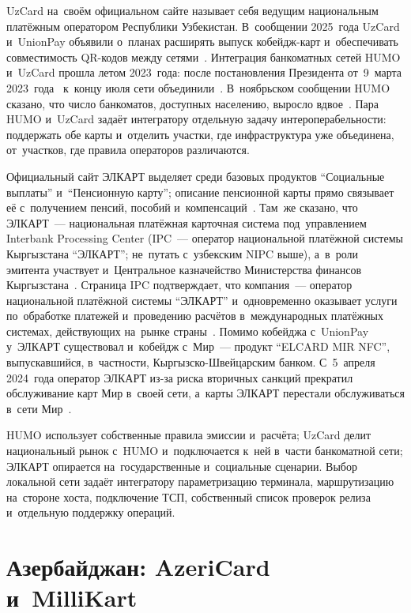 UzCard на~своём официальном сайте называет себя ведущим национальным
платёжным оператором Республики Узбекистан. В~сообщении 2025~года UzCard
и~UnionPay объявили о~планах расширять выпуск кобейдж-карт и~обеспечивать
совместимость QR-кодов между сетями~\cite{uzcard-unionpay-2025}. Интеграция
банкоматных сетей HUMO и~UzCard прошла летом 2023~года: после постановления
Президента от~9~марта 2023~года~\cite{gazeta-uz-humo-uzcard-decree-2023} к~концу июля
сети объединили~\cite{gazeta-uz-humo-uzcard-atm-2023}. В~ноябрьском сообщении
HUMO сказано, что число банкоматов, доступных населению, выросло
вдвое~\cite{humo-uzcard-atm-2023}. Пара HUMO и~UzCard задаёт интегратору
отдельную задачу интероперабельности: поддержать обе карты и~отделить участки,
где инфраструктура уже объединена, от~участков, где правила операторов
различаются.

Официальный сайт ЭЛКАРТ выделяет среди базовых продуктов \enquote{Социальные
выплаты} и~\enquote{Пенсионную карту}; описание пенсионной карты прямо
связывает её с~получением пенсий, пособий и~компенсаций~\cite{elkart-home}.
Там~же сказано, что ЭЛКАРТ~--- национальная платёжная карточная система
под~управлением Interbank Processing Center (IPC~--- оператор национальной
  платёжной системы Кыргызстана \enquote{ЭЛКАРТ}; не~путать с~узбекским NIPC
выше), а~в~роли эмитента участвует и~Центральное казначейство Министерства
финансов Кыргызстана~\cite{elkart-home}. Страница IPC подтверждает, что
компания~--- оператор национальной платёжной системы \enquote{ЭЛКАРТ}
и~одновременно оказывает услуги по~обработке платежей и~проведению расчётов
в~международных платёжных системах, действующих на~рынке
страны~\cite{ipc-elkart-company}. Помимо кобейджа с~UnionPay у~ЭЛКАРТ
существовал и~кобейдж с~Мир~--- продукт \enquote{ELCARD MIR NFC}, выпускавшийся,
в~частности, Кыргызско-Швейцарским банком. С~5~апреля 2024~года оператор ЭЛКАРТ
из-за риска вторичных санкций прекратил обслуживание карт Мир в~своей сети,
а~карты ЭЛКАРТ перестали обслуживаться в~сети Мир~\cite{interfax-elcart-mir-2024}.

HUMO использует собственные правила эмиссии и~расчёта; UzCard делит
национальный рынок с~HUMO и~подключается к~ней в~части банкоматной сети;
ЭЛКАРТ опирается на~государственные и~социальные сценарии. Выбор локальной
сети задаёт интегратору параметризацию терминала, маршрутизацию на~стороне
хоста, подключение ТСП, собственный список проверок релиза и~отдельную
поддержку операций.

\section{Азербайджан: AzeriCard и~MilliKart}\label{sec:regional-azerbaijan}

